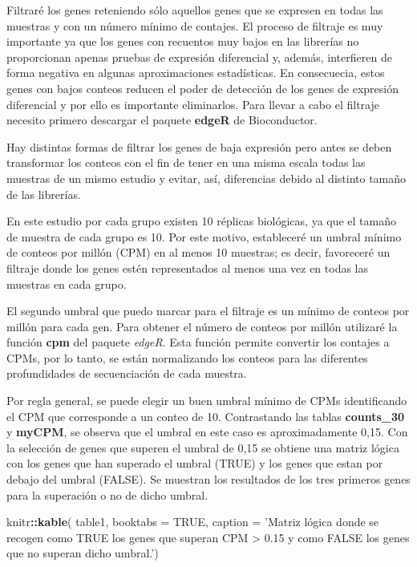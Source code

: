 \documentclass[]{article}
\newenvironment{Shaded}{\begin{snugshade}}{\end{snugshade}}
\newcommand{\DataTypeTok}[1]{\textcolor[rgb]{0.13,0.29,0.53}{#1}}
\newcommand{\KeywordTok}[1]{\textcolor[rgb]{0.13,0.29,0.53}{\textbf{#1}}}
\newcommand{\NormalTok}[1]{#1}
\newcommand{\OperatorTok}[1]{\textcolor[rgb]{0.81,0.36,0.00}{\textbf{#1}}}
\newcommand{\OtherTok}[1]{\textcolor[rgb]{0.56,0.35,0.01}{#1}}
\newcommand{\StringTok}[1]{\textcolor[rgb]{0.31,0.60,0.02}{#1}}
\begin{document}
Filtraré los genes reteniendo sólo aquellos genes que se expresen en
todas las muestras y con un número mínimo de contajes. El proceso de
filtraje es muy importante ya que los genes con recuentos muy bajos en
las librerías no proporcionan apenas pruebas de expresión diferencial y,
además, interfieren de forma negativa en algunas aproximaciones
estadísticas. En consecuecia, estos genes con bajos conteos reducen el
poder de detección de los genes de expresión diferencial y por ello es
importante eliminarlos. Para llevar a cabo el filtraje necesito primero
descargar el paquete \textbf{edgeR} de Bioconductor.

Hay distintas formas de filtrar los genes de baja expresión pero antes
se deben transformar los conteos con el fin de tener en una misma escala
todas las muestras de un mismo estudio y evitar, así, diferencias debido
al distinto tamaño de las librerías.

En este estudio por cada grupo existen 10 réplicas biológicas, ya que el
tamaño de muestra de cada grupo es 10. Por este motivo, estableceré un
umbral mínimo de conteos por millón (CPM) en al menos 10 muestras; es
decir, favoreceré un filtraje donde los genes estén representados al
menos una vez en todas las muestras en cada grupo.

El segundo umbral que puedo marcar para el filtraje es un mínimo de
conteos por millón para cada gen. Para obtener el número de conteos por
millón utilizaré la función \textbf{cpm} del paquete \emph{edgeR}. Esta
función permite convertir los contajes a CPMs, por lo tanto, se están
normalizando los conteos para las diferentes profundidades de
secuenciación de cada muestra.

Por regla general, se puede elegir un buen umbral mínimo de CPMs
identificando el CPM que corresponde a un conteo de 10. Contrastando las
tablas \textbf{counts\_30} y \textbf{myCPM}, se observa que el umbral en
este caso es aproximadamente 0,15. Con la selección de genes que superen
el umbral de 0,15 se obtiene una matriz lógica con los genes que han
superado el umbral (TRUE) y los genes que estan por debajo del umbral
(FALSE). Se muestran los resultados de los tres primeros genes para la
superación o no de dicho umbral.

\begin{Shaded}
\begin{Highlighting}[]
\NormalTok{knitr}\OperatorTok{::}\KeywordTok{kable}\NormalTok{(}
\NormalTok{  table1, }\DataTypeTok{booktabs =} \OtherTok{TRUE}\NormalTok{,}
  \DataTypeTok{caption =} \StringTok{'Matriz lógica donde se recogen como TRUE los genes que superan CPM > 0.15 y como FALSE los genes que no superan dicho umbral.'}\NormalTok{)}
\end{Highlighting}
\end{Shaded}
\end{document}
